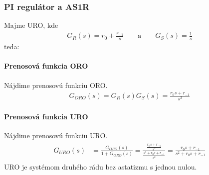 \documentclass[a4paper, 10pt, ]{article}
\begin{document}
\begin{center}



    \figcaption{}

\end{center}









\subsubsection{PI regulátor a AS1R}

Majme URO, kde
\begin{align}
    G_R(s) = r_0 + \frac{r_{-1}}{s} \qquad \text{a} \qquad  G_S(s) = \frac{1}{s}
\end{align}
teda:

\begin{center}

    \makebox[\textwidth][c]{%
    
    }

	\figcaption{}
	\label{URO_PI_AS1R}

\end{center}

\paragraph{Prenosová funkcia ORO}
Nájdime prenosovú funkciu ORO.
\begin{align}
    G_{ORO}(s) = G_R(s) G_S(s) =  \frac{r_0 s + r_{-1}}{s^2}
\end{align}


\paragraph{Prenosová funkcia URO}
Nájdime prenosovú funkciu URO.
\begin{align}
    \begin{aligned}
    G_{URO}(s)
    &=  \frac{G_{ORO}(s)}{1+G_{ORO}(s)}
    = \frac{   \frac{r_0 s + r_{-1}}{s^2}   }{     \frac{s^2 + r_0 s + r_{-1}}{s^2}   }
    = \frac{  r_0 s + r_{-1}   }{    s^2 + r_0 s + r_{-1}   }
    \end{aligned}
\end{align}
URO je systémom druhého rádu bez astatizmu s jednou nulou.
\end{document}
